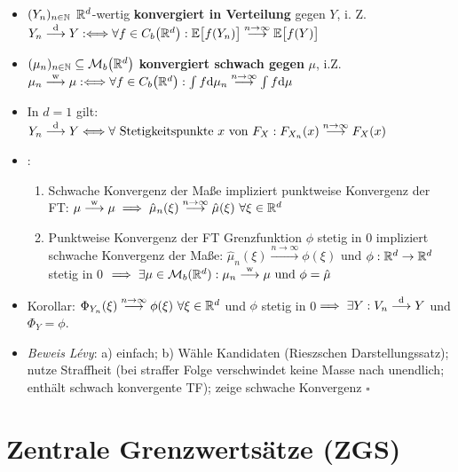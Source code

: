\documentclass[12pt]{scrartcl}
\begin{document}
	\begin{itemize}
		\item $(Y_n)_{n\in\mathbb{N}}$ $\mathbb{R}^d$-wertig \textbf{konvergiert in Verteilung} gegen $Y$, i. Z.
		$
		Y_n\overset{\mathrm{d}}{\longrightarrow}Y
		:\Longleftrightarrow\forall f\in C_b\big(\mathbb{R}^d\big):
		\mathbb{E}\big[f(Y_n)\big]\overset{n\to\infty}{\longrightarrow}\mathbb{E}\big[f(Y)\big]
		$
		\item $(\mu_n)_{n\in\mathbb{N}}\subseteq\mathcal{M}_b\big(\mathbb{R}^d\big)$ \textbf{konvergiert schwach gegen} $\mu$, i.Z.
		$
		\mu_n\overset{\text{w}}{\longrightarrow}\mu 
		:\Longleftrightarrow\forall f\in C_b\big(\mathbb{R}^d\big):\int\limits f\mathrm{d}\mu_n\overset{n\to\infty}{\longrightarrow}\int\limits f\mathrm{d}\mu 
		$
		\item In $d=1$ gilt: $Y_n\overset{\mathrm{d}}{\longrightarrow}Y
			\Longleftrightarrow\forall\text{ Stetigkeitspunkte $x$ von }F_X:
			F_{X_n}(x)\overset{n\to\infty}{\longrightarrow} F_X(x)
		$
		\item {}: 
		\begin{enumerate}
			\item Schwache Konvergenz der Maße impliziert punktweise Konvergenz der FT: $\mu\overset{\text{w}}{\longrightarrow}\mu\implies\hat{\mu}_n(\xi)\overset{n\to\infty}{\longrightarrow}\hat{\mu}(\xi)~\forall\xi\in\mathbb{R}^d$
			\item Punktweise Konvergenz der FT  Grenzfunktion $\phi$ stetig in 0 impliziert schwache Konvergenz der Maße: $\hat{\mu}_n(\xi)\overset{n\to\infty}{\longrightarrow}\phi(\xi)$ und $\phi:\mathbb{R}^d\to\mathbb{R}^d$ stetig in 0 $\implies\exists\mu\in\mathcal{M}_b(\mathbb{R}^d):\mu_n\overset{\text{w}}{\longrightarrow}\mu\text{ und }\phi=\hat{\mu}$
		\end{enumerate}
		\item Korollar: $\Phi_{Y_n}(\xi)\overset{n\to\infty}{\longrightarrow}\phi(\xi)~\forall\xi\in\mathbb{R}^d$ und $\phi$ stetig in 0$\implies\exists Y:V_n\overset{\mathrm{d}}{\longrightarrow}Y$ und $\Phi_Y=\phi$.
		\item \textit{Beweis Lévy}: a) einfach; b) 
		Wähle Kandidaten (Rieszschen Darstellungssatz); nutze Straffheit (bei straffer Folge verschwindet keine Masse nach unendlich; enthält schwach konvergente TF); zeige schwache Konvergenz $\square$
	\end{itemize}
	
	\section{Zentrale Grenzwertsätze (ZGS)}
	
\end{document}
